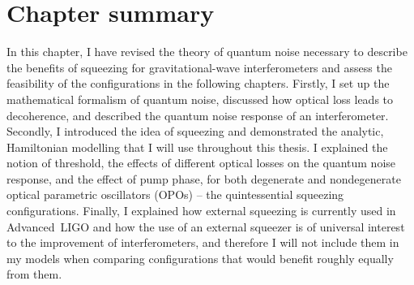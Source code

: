 

\section{Chapter summary}


In this chapter, I have revised the theory of quantum noise necessary to describe the benefits of squeezing for gravitational-wave interferometers and assess the feasibility of the configurations in the following chapters. Firstly, I set up the mathematical formalism of quantum noise, discussed how optical loss leads to decoherence, and described the quantum noise response of an interferometer. Secondly, I introduced the idea of squeezing and demonstrated the analytic, Hamiltonian modelling that I will use throughout this thesis. I explained the notion of threshold, the effects of different optical losses on the quantum noise response, and the effect of pump phase, for both degenerate and nondegenerate optical parametric oscillators (OPOs) -- the quintessential squeezing configurations. Finally, I explained how external squeezing is currently used in Advanced~LIGO and how the use of an external squeezer is of universal interest to the improvement of interferometers, and therefore I will not include them in my models when comparing configurations that would benefit roughly equally from them. %


